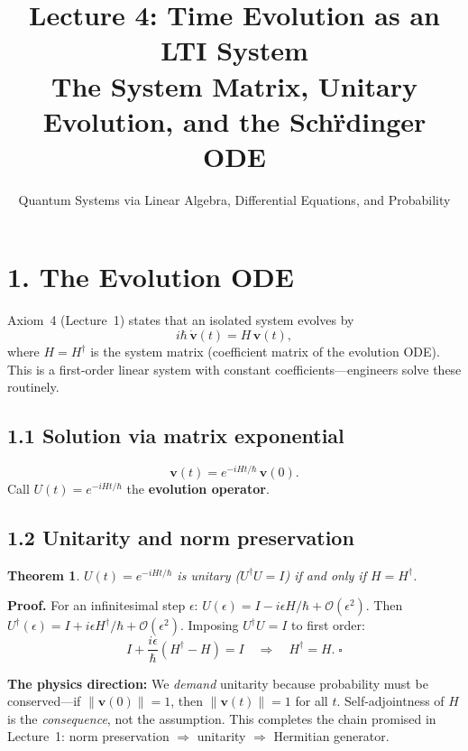 \documentclass[12pt,a4paper]{article}
\title{\textbf{Lecture 4: Time Evolution as an LTI System} \\ \large The System Matrix, Unitary Evolution, and the Schr\"{}dinger ODE}
\author{Quantum Systems via Linear Algebra, Differential Equations, and Probability}
\date{}
\newtheorem{theorem}{Theorem}
\begin{document}
\maketitle
\thispagestyle{fancy}

\section{1. The Evolution ODE}

Axiom~4 (Lecture~1) states that an isolated system evolves by
\[
    i\hbar\,\dot{\mathbf{v}}(t) = H\,\mathbf{v}(t),
\]
where $H = H^\dagger$ is the system matrix (coefficient matrix of the evolution ODE).  This is a first-order linear system with constant coefficients---engineers solve these routinely.

\subsection{1.1 Solution via matrix exponential}
\[
    \mathbf{v}(t) = e^{-iHt/\hbar}\,\mathbf{v}(0).
\]
Call $U(t) = e^{-iHt/\hbar}$ the \textbf{evolution operator}.

\subsection{1.2 Unitarity and norm preservation}

\begin{theorem}
$U(t) = e^{-iHt/\hbar}$ is unitary ($U^\dagger U = I$) if and only if $H = H^\dagger$.
\end{theorem}

\noindent\textbf{Proof.}  For an infinitesimal step $\epsilon$: $U(\epsilon) = I - i\epsilon H/\hbar + \mathcal{O}(\epsilon^2)$.  Then $U^\dagger(\epsilon) = I + i\epsilon H^\dagger/\hbar + \mathcal{O}(\epsilon^2)$.  Imposing $U^\dagger U = I$ to first order:
\[
    I + \frac{i\epsilon}{\hbar}(H^\dagger - H) = I \quad\Longrightarrow\quad H^\dagger = H.\;\square
\]

\noindent\textbf{The physics direction:} We \emph{demand} unitarity because probability must be conserved---if $\|\mathbf{v}(0)\|=1$, then $\|\mathbf{v}(t)\|=1$ for all $t$.  Self-adjointness of $H$ is the \emph{consequence}, not the assumption.  This completes the chain promised in Lecture~1: norm preservation $\Rightarrow$ unitarity $\Rightarrow$ Hermitian generator.
\end{document}
